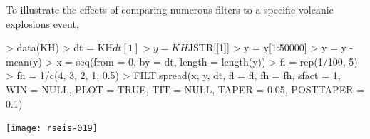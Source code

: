 \documentclass{article}
\begin{document}
To illustrate the effects of comparing numerous filters to 
a specific volcanic explosions event,


\begin{Schunk}
\begin{Sinput}
> data(KH)
> dt = KH$dt[1]
> y = KH$JSTR[[1]]
> y = y[1:50000]
> y = y - mean(y)
> x = seq(from = 0, by = dt, length = length(y))
> fl = rep(1/100, 5)
> fh = 1/c(4, 3, 2, 1, 0.5)
> FILT.spread(x, y, dt, fl = fl, fh = fh, sfact = 1, WIN = NULL, 
     PLOT = TRUE, TIT = NULL, TAPER = 0.05, POSTTAPER = 0.1)
\end{Sinput}
\end{Schunk}
\texttt{[image: rseis-019]}
\end{document}

